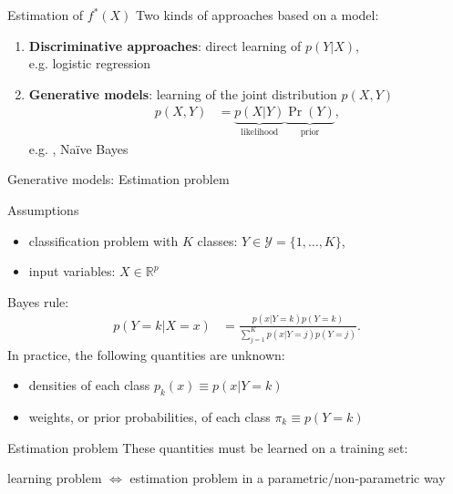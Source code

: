 \begin{frame}{Estimation of $f^{\ast}(X)$}
Two kinds of approaches based on a model:
\begin{enumerate}
 \item \textbf{Discriminative approaches}: direct learning  of $p{(Y|X)}$,\\
   e.g. logistic regression
 \item \textbf{Generative models}: learning of the joint distribution $p(X,Y)$
 \begin{align*}
  p(X,Y) &= \underbrace{p(X|Y)}_{\textrm{likelihood}} \underbrace{\Pr{(Y)}}_{\textrm{prior}},
 \end{align*}
e.g. , Naïve Bayes
\end{enumerate}

\end{frame}



\begin{frame}{Generative models: Estimation problem}
\begin{block}{Assumptions}
 \begin{itemize}
  \item classification problem with $K$ classes: $Y \in \mathcal{Y}=\{1,\ldots,K\}$,
  \item input variables: $X \in \mathbb{R}^p$
 \end{itemize}
\end{block}
 Bayes rule:
  \begin{align*}
 p{(Y=k|X=x)} & = \frac{p(x| Y=k)p{(Y=k)} } { \sum_{j=1}^K p(x|Y=j)p{(Y=j)}  }.
 \end{align*}
 In practice, the following quantities are unknown:
 \begin{itemize}
  \item densities of each class $p_k(x) \equiv p(x| Y=k)$
  \item weights, or prior probabilities, of  each class  $\pi_k \equiv p{(Y=k)}$
 \end{itemize}

\begin{block}{Estimation problem}
 These quantities must be learned on a training set:\\
 \begin{center}
  {learning problem \alert{ $\Leftrightarrow$ estimation problem} in a parametric/non-parametric way }
 \end{center}

\end{block}

\end{frame}


